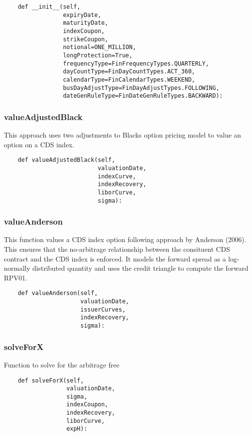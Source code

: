 \documentclass[twoside,11pt]{book}
\begin{document}
\begin{lstlisting}
    def __init__(self,
                 expiryDate,
                 maturityDate,
                 indexCoupon,
                 strikeCoupon,
                 notional=ONE_MILLION,
                 longProtection=True,
                 frequencyType=FinFrequencyTypes.QUARTERLY,
                 dayCountType=FinDayCountTypes.ACT_360,
                 calendarType=FinCalendarTypes.WEEKEND,
                 busDayAdjustType=FinDayAdjustTypes.FOLLOWING,
                 dateGenRuleType=FinDateGenRuleTypes.BACKWARD):
\end{lstlisting}

\subsubsection*{{\bf valueAdjustedBlack}}
This approach uses two adjustments to Blacks option pricing model to value an option on a CDS index.  

\begin{lstlisting}
    def valueAdjustedBlack(self,
                           valuationDate,
                           indexCurve,
                           indexRecovery,
                           liborCurve,
                           sigma):
\end{lstlisting}

\subsubsection*{{\bf valueAnderson}}
This function values a CDS index option following approach by Anderson (2006). This ensures that the no-arbitrage relationship between the consituent CDS contract and the CDS index is enforced. It models the forward spread as a log-normally distributed quantity and uses the credit triangle to compute the forward RPV01.  

\begin{lstlisting}
    def valueAnderson(self,
                      valuationDate,
                      issuerCurves,
                      indexRecovery,
                      sigma):
\end{lstlisting}

\subsubsection*{{\bf solveForX}}
Function to solve for the arbitrage free  

\begin{lstlisting}
    def solveForX(self,
                  valuationDate,
                  sigma,
                  indexCoupon,
                  indexRecovery,
                  liborCurve,
                  expH):
\end{lstlisting}
\end{document}
